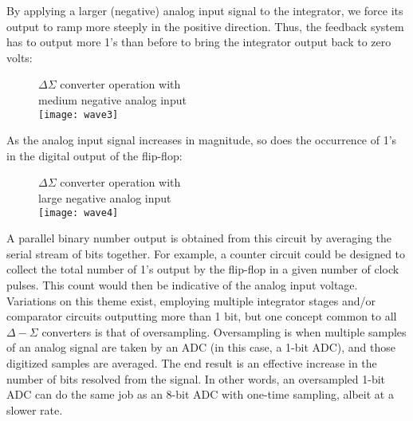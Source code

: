 By applying a larger (negative) analog input signal to the integrator,
we force its output to ramp more steeply in the positive direction. Thus,
the feedback system has to output more 1's than before to bring the
integrator output back to zero volts: 

\begin{figure}[!h]
\centering
$\Delta\Sigma$ converter operation with\\ medium negative analog input\\
\texttt{[image: wave3]}
\end{figure}

As the analog input signal increases in magnitude, so does the occurrence
of 1's in the digital output of the flip-flop: 

\begin{figure}[!h]
\centering
$\Delta\Sigma$ converter operation with\\ large negative analog input\\
\texttt{[image: wave4]}
\end{figure}

A parallel binary number output is obtained from this circuit by averaging
the serial stream of bits together. For example, a counter circuit could be
designed to collect the total number of 1's output by the flip-flop in a
given number of clock pulses. This count would then be indicative of the
analog input voltage. Variations on this theme exist, employing multiple
integrator stages and/or comparator circuits outputting more than 1 bit,
but one concept common to all $\Delta-\Sigma$ converters is that of
oversampling. Oversampling is when multiple samples of an analog signal are
taken by an ADC (in this case, a 1-bit ADC), and those digitized samples are
averaged. The end result is an effective increase in the number of bits
resolved from the signal. In other words, an oversampled 1-bit ADC can do
the same job as an 8-bit ADC with one-time sampling, albeit at a slower rate. 
\rm
